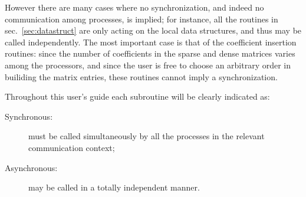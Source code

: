 However there are many cases where no synchronization, and indeed no
communication among processes, is implied; for instance, all the routines in
sec.~\ref{sec:datastruct} are only acting on the local data structures,
and thus may be called independently. The most important case is that
of the coefficient insertion routines: since the number of
coefficients in the sparse and dense matrices varies among the
processors, and since the user is free to choose an arbitrary order in
builiding the matrix entries, these routines cannot imply a
synchronization. 

Throughout this user's guide each subroutine will be clearly indicated
as:
\begin{description}
\item[Synchronous:] must be called simultaneously by all the
  processes in the relevant communication context;
\item[Asynchronous:] may be called in a totally independent manner.
\end{description}

